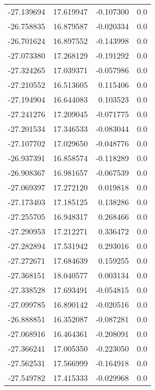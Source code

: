 \begin{tabular}{rrrr}
      -27.139694 &        17.619947 &   -0.107300 &   0.0 \\
      -26.758835 &        16.879587 &   -0.020334 &   0.0 \\
      -26.701624 &        16.897552 &   -0.143998 &   0.0 \\
      -27.073380 &        17.268129 &   -0.191292 &   0.0 \\
      -27.324265 &        17.039371 &   -0.057986 &   0.0 \\
      -27.210552 &        16.513605 &    0.115406 &   0.0 \\
      -27.194904 &        16.644083 &    0.103523 &   0.0 \\
      -27.241276 &        17.209045 &   -0.071775 &   0.0 \\
      -27.201534 &        17.346533 &   -0.083044 &   0.0 \\
      -27.107702 &        17.029650 &   -0.048776 &   0.0 \\
      -26.937391 &        16.858574 &   -0.118289 &   0.0 \\
      -26.908367 &        16.981657 &   -0.067539 &   0.0 \\
      -27.069397 &        17.272120 &    0.019818 &   0.0 \\
      -27.173403 &        17.185125 &    0.138286 &   0.0 \\
      -27.255705 &        16.948317 &    0.268466 &   0.0 \\
      -27.290953 &        17.212271 &    0.336472 &   0.0 \\
      -27.282894 &        17.531942 &    0.293016 &   0.0 \\
      -27.272671 &        17.684639 &    0.159255 &   0.0 \\
      -27.368151 &        18.040577 &    0.003134 &   0.0 \\
      -27.338528 &        17.693491 &   -0.054815 &   0.0 \\
      -27.099785 &        16.890142 &   -0.020516 &   0.0 \\
      -26.888851 &        16.352087 &   -0.087281 &   0.0 \\
      -27.068916 &        16.464361 &   -0.208091 &   0.0 \\
      -27.366241 &        17.005350 &   -0.223050 &   0.0 \\
      -27.562531 &        17.566999 &   -0.164918 &   0.0 \\
      -27.549782 &        17.415333 &   -0.029968 &   0.0 \\

\end{tabular}
